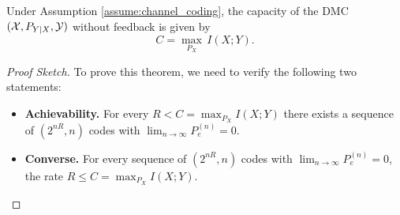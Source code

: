 \documentclass[11pt,a4paper]{article}
\begin{document}
\begin{theorem}
    Under Assumption \ref{assume:channel_coding}, the capacity of the DMC $(\mathcal{X},P_{Y|X},\mathcal{Y})$ without feedback is given by
    \begin{equation*}
        C = \max_{P_X}\,I(X;Y).
    \end{equation*}
\end{theorem}

\begin{proof}[Proof Sketch]\renewcommand{\qedsymbol}{}
    To prove this theorem, we need to verify the following two statements:
    \begin{itemize}
        \item \textbf{Achievability.} For every $R < C = \max_{P_X}I(X;Y)$ there exists a sequence of $(2^{nR}, n)$ codes with $\lim_{n\rightarrow \infty} P_e^{(n)} = 0$.
        \item \textbf{Converse.} For every sequence of $(2^{nR}, n)$ codes with $\lim_{n\rightarrow \infty} P_e^{(n)} = 0$, the rate $R \le C = \max_{P_X}I(X;Y)$.
    \end{itemize}
\end{proof}
\end{document}
